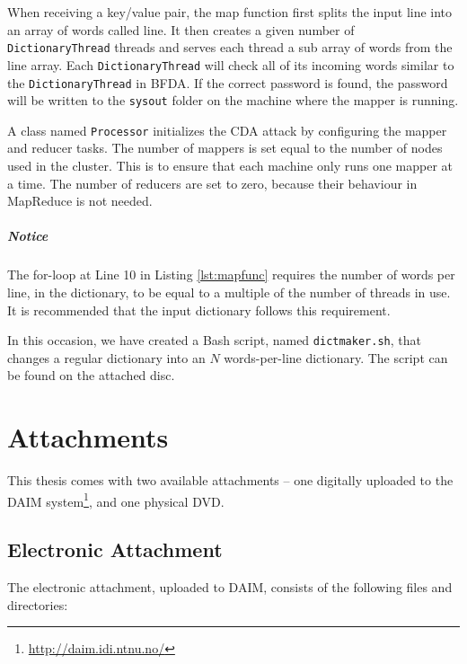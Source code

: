 \documentclass[pdftex,english,10pt,b5paper,twoside]{book}
\begin{document}


When receiving a key/value pair, the map function first splits the input line
into an array of words called line. It then creates a given number of
\texttt{DictionaryThread} threads and serves each thread a sub array of words from the
line array. Each \texttt{DictionaryThread} will check all of its incoming words similar
to the \texttt{DictionaryThread} in BFDA. If the correct password is found, the
password will be written to the \texttt{sysout} folder on the machine where the mapper is
running.

A class named \texttt{Processor} initializes the \ac{CDA} attack by configuring
the mapper and reducer tasks. The number of mappers is set equal to the number
of nodes used in the cluster. This is to ensure that each machine only runs one
mapper at a time. The number of reducers are set to zero, because their
behaviour in MapReduce is not needed.

\paragraph{Notice} The for-loop at Line 10 in Listing \ref{lst:mapfunc}
requires the number of words per line, in the dictionary, to be equal to a
multiple of the number of threads in use. It is recommended that the input
dictionary follows this requirement.

In this occasion, we have created a Bash script, named \texttt{dictmaker.sh},
that changes a regular dictionary into an $N$ words-per-line dictionary. The
script can be found on the attached disc.

\chapter{Attachments}
\label{ap:attachments}

This thesis comes with two available attachments -- one digitally uploaded to
the DAIM system\footnote{\url{http://daim.idi.ntnu.no/}}, and one physical DVD.

\section{Electronic Attachment}

The electronic attachment, uploaded to
DAIM, consists of the following files
and directories:
\end{document}
